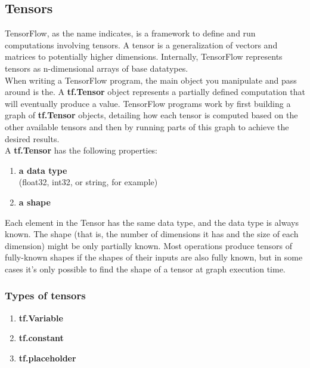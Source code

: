     \subsection{Tensors}
    TensorFlow, as the name indicates, is a framework to define and run computations involving tensors. A tensor is a generalization of vectors and matrices to potentially higher dimensions. Internally, TensorFlow represents tensors as n-dimensional arrays of base datatypes.\\
    When writing a TensorFlow program, the main object you manipulate and pass around is the. A \textbf{tf.Tensor} object represents a partially defined computation that will eventually produce a value. TensorFlow programs work by first building a graph of \textbf{tf.Tensor} objects, detailing how each tensor is computed based on the other available tensors and then by running parts of this graph to achieve the desired results.\cite{web006}\\
    A \textbf{tf.Tensor} has the following properties:
    \begin{enumerate}
      \item\textbf{a data type}\\ 
      (float32, int32, or string, for example)
      \item\textbf{a shape}
      \end{enumerate}
      Each element in the Tensor has the same data type, and the data type is always known. The shape (that is, the number of dimensions it has and the size of each dimension) might be only partially known. Most operations produce tensors of fully-known shapes if the shapes of their inputs are also fully known, but in some cases it's only possible to find the shape of a tensor at graph execution time.
    \subsubsection{Types of tensors}
      \begin{enumerate}
    \item\textbf{tf.Variable}
    \item\textbf{tf.constant}
    \item\textbf{tf.placeholder}
    \end{enumerate}
